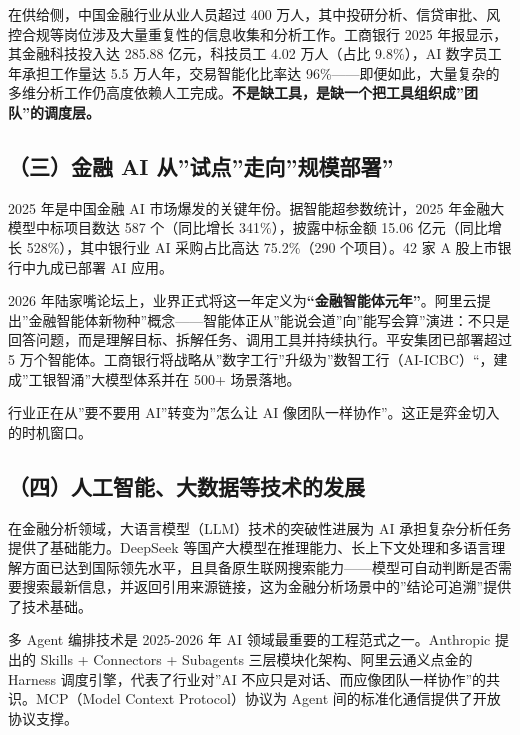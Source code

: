 \documentclass[
]{ctexart}
\begin{document}
在供给侧，中国金融行业从业人员超过 400
万人，其中投研分析、信贷审批、风控合规等岗位涉及大量重复性的信息收集和分析工作。工商银行
2025 年报显示，其金融科技投入达 285.88 亿元，科技员工 4.02 万人（占比
9.8\%），AI 数字员工年承担工作量达 5.5 万人年，交易智能化比率达
96\%------即便如此，大量复杂的多维分析工作仍高度依赖人工完成。\textbf{不是缺工具，是缺一个把工具组织成''团队''的调度层。}

\subsection{（三）金融 AI
从''试点''走向''规模部署''}\label{ux4e09ux91d1ux878d-ai-ux4eceux8bd5ux70b9ux8d70ux5411ux89c4ux6a21ux90e8ux7f72}

2025 年是中国金融 AI 市场爆发的关键年份。据智能超参数统计，2025
年金融大模型中标项目数达 587 个（同比增长 341\%），披露中标金额 15.06
亿元（同比增长 528\%），其中银行业 AI 采购占比高达 75.2\%（290
个项目）。42 家 A 股上市银行中九成已部署 AI 应用。

2026
年陆家嘴论坛上，业界正式将这一年定义为\textbf{``金融智能体元年''}。阿里云提出''金融智能体新物种''概念------智能体正从''能说会道''向''能写会算''演进：不只是回答问题，而是理解目标、拆解任务、调用工具并持续执行。平安集团已部署超过
5
万个智能体。工商银行将战略从''数字工行''升级为''数智工行（AI-ICBC）``，建成''工银智涌''大模型体系并在
500+ 场景落地。

行业正在从''要不要用 AI''转变为''怎么让 AI
像团队一样协作''。这正是弈金切入的时机窗口。

\subsection{（四）人工智能、大数据等技术的发展}\label{ux56dbux4ebaux5de5ux667aux80fdux5927ux6570ux636eux7b49ux6280ux672fux7684ux53d1ux5c55}

在金融分析领域，大语言模型（LLM）技术的突破性进展为 AI
承担复杂分析任务提供了基础能力。DeepSeek
等国产大模型在推理能力、长上下文处理和多语言理解方面已达到国际领先水平，且具备原生联网搜索能力------模型可自动判断是否需要搜索最新信息，并返回引用来源链接，这为金融分析场景中的''结论可追溯''提供了技术基础。

多 Agent 编排技术是 2025-2026 年 AI 领域最重要的工程范式之一。Anthropic
提出的 Skills + Connectors + Subagents 三层模块化架构、阿里云通义点金的
Harness 调度引擎，代表了行业对''AI
不应只是对话、而应像团队一样协作''的共识。MCP（Model Context
Protocol）协议为 Agent 间的标准化通信提供了开放协议支撑。
\end{document}
